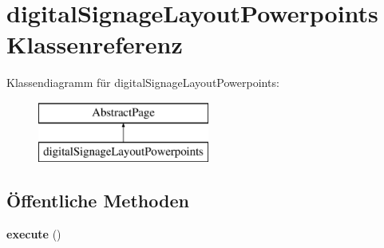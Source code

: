 \hypertarget{classdigital_signage_layout_powerpoints}{}\section{digital\+Signage\+Layout\+Powerpoints Klassenreferenz}
\label{classdigital_signage_layout_powerpoints}
Klassendiagramm für digital\+Signage\+Layout\+Powerpoints\+:\begin{figure}[H]
\begin{center}
\leavevmode
\includegraphics[height=2.000000cm]{classdigital_signage_layout_powerpoints}
\end{center}
\end{figure}
\subsection*{Öffentliche Methoden}
\begin{DoxyCompactItemize}
\item 
\mbox{\label{classdigital_signage_layout_powerpoints_a1f68ea771f898aff29c8d775c9a02421}} 
{\bfseries execute} ()
\end{DoxyCompactItemize}
